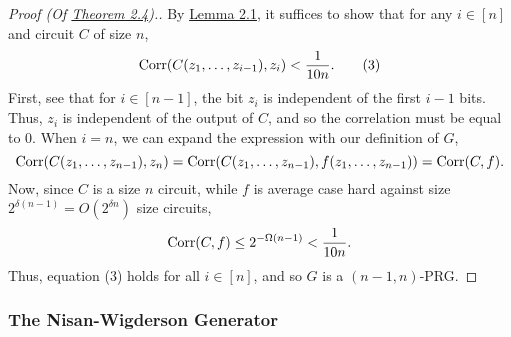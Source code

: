 \documentclass[11pt]{article}
\begin{document}
\begin{proof}[Proof \textup{(Of \hyperref[t-2-4]{Theorem 2.4})}.]
    By \hyperref[l-2-1]{Lemma 2.1}, it suffices to show that for any $i \in [n]$ and circuit $C$ of size $n$, 
    \begin{equation*}
        \mathrm{Corr}(C(z_1, \ldots, z_{i - 1}), z_i) < \frac{1}{10 n}. \tag{3}
    \end{equation*}
    First, see that for $i \in [n - 1]$, the bit $z_i$ is independent of the first $i - 1$ bits. Thus, $z_i$ is independent of the output of $C$, and so the correlation must be equal to $0$. When $i = n$, we can expand the expression with our definition of $G$,
    \begin{equation*}
        \mathrm{Corr}(C(z_1, \ldots, z_{n - 1}), z_n) = \mathrm{Corr}(C(z_1, \ldots, z_{n - 1}), f(z_1, \ldots, z_{n - 1})) = \mathrm{Corr}(C, f).
    \end{equation*}
    Now, since $C$ is a size $n$ circuit, while $f$ is average case hard against size $2^{\delta (n - 1)} = O(2^{\delta n})$ size circuits,
    \begin{equation*}
        \mathrm{Corr}(C, f) \leq 2^{-\Omega(n - 1)} < \frac{1}{10 n}.
    \end{equation*}
    Thus, equation (3) holds for all $i \in [n]$, and so $G$ is a $(n - 1, n)$-PRG.
\end{proof}

\subsubsection{The Nisan-Wigderson Generator}
\end{document}
